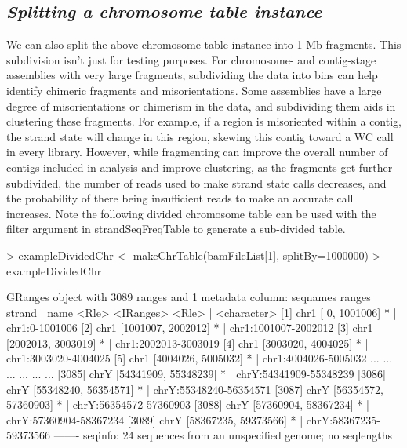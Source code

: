 \documentclass{article}
\begin{document}
\subsection{\textit{Splitting a chromosome table instance}}

We can also split the above chromosome table instance into 1 Mb fragments. This subdivision isn't just for testing purposes. For chromosome- and contig-stage assemblies with very large fragments, subdividing the data into bins can help identify chimeric fragments and misorientations. Some assemblies have a large degree of misorientations or chimerism in the data, and subdividing them aids in clustering these fragments.  For example, if a region is misoriented within a contig, the strand state will change in this region, skewing this contig toward a WC call in every library. However, while fragmenting can improve the overall number of contigs included in analysis and improve clustering, as the fragments get further subdivided, the number of reads used to make strand state calls decreases, and the probability of there being insufficient reads to make an accurate call increases.  Note the following divided chromosome table can be used with the filter argument in strandSeqFreqTable to generate a sub-divided table.

\begin{Schunk}
\begin{Sinput}
> exampleDividedChr <- makeChrTable(bamFileList[1], splitBy=1000000)
> exampleDividedChr
\end{Sinput}
\begin{Soutput}
GRanges object with 3089 ranges and 1 metadata column:
         seqnames               ranges strand   |                   name
            <Rle>            <IRanges>  <Rle>   |            <character>
     [1]     chr1   [      0, 1001006]      *   |         chr1:0-1001006
     [2]     chr1   [1001007, 2002012]      *   |   chr1:1001007-2002012
     [3]     chr1   [2002013, 3003019]      *   |   chr1:2002013-3003019
     [4]     chr1   [3003020, 4004025]      *   |   chr1:3003020-4004025
     [5]     chr1   [4004026, 5005032]      *   |   chr1:4004026-5005032
     ...      ...                  ...    ... ...                    ...
  [3085]     chrY [54341909, 55348239]      *   | chrY:54341909-55348239
  [3086]     chrY [55348240, 56354571]      *   | chrY:55348240-56354571
  [3087]     chrY [56354572, 57360903]      *   | chrY:56354572-57360903
  [3088]     chrY [57360904, 58367234]      *   | chrY:57360904-58367234
  [3089]     chrY [58367235, 59373566]      *   | chrY:58367235-59373566
  -------
  seqinfo: 24 sequences from an unspecified genome; no seqlengths
\end{Soutput}
\end{Schunk}
\end{document}
